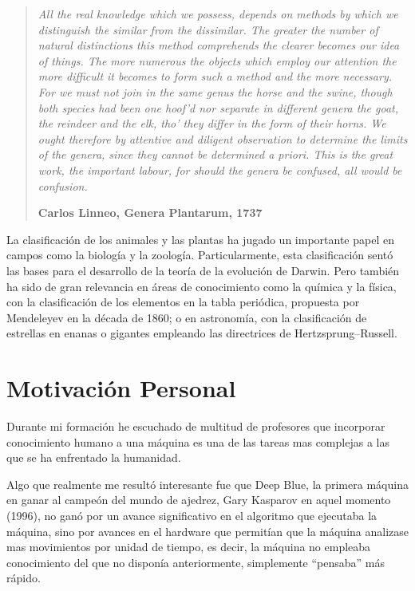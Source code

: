 \begin{quotation}{\slshape
		All the real knowledge which we possess, depends on methods by which we distinguish the similar from the dissimilar. The greater the number of natural distinctions this method comprehends the clearer becomes our idea of things. The
		more numerous the objects which employ our attention the more difficult it becomes to
		form such a method and the more necessary.
		For we must not join in the same genus the horse and the swine, though both species
		had been one hoof’d nor separate in different genera the goat, the reindeer and the elk,
		tho’ they differ in the form of their horns. We ought therefore by attentive and diligent
		observation to determine the limits of the genera, since they cannot be determined a
		priori. This is the great work, the important labour, for should the genera be confused,
		all would be confusion.} 
		\begin{flushright}
			\textbf{Carlos Linneo, Genera Plantarum, 1737}
		\end{flushright}
\end{quotation}

La clasificación de los animales y las plantas ha jugado un importante papel en campos como la biología y la zoología. Particularmente, esta clasificación sentó las bases para el desarrollo de la teoría de la evolución de Darwin. Pero también ha sido de gran relevancia en áreas de conocimiento como la química y la física, con la clasificación de los elementos en la tabla periódica, propuesta por Mendeleyev en la década de 1860; o en astronomía, con la clasificación de estrellas en enanas o gigantes empleando las directrices de Hertzsprung–Russell.

\section{Motivación Personal}

Durante mi formación he escuchado de multitud de profesores que incorporar conocimiento humano a una máquina es una de las tareas mas complejas a las que se ha enfrentado la humanidad.

Algo que realmente me resultó interesante fue que Deep Blue, la primera máquina en ganar al campeón del mundo de ajedrez, Gary Kasparov en aquel momento (1996), no ganó por un avance significativo en el algoritmo que ejecutaba la máquina, sino por avances en el hardware que permitían que la máquina analizase mas movimientos por unidad de tiempo, es decir, la máquina no empleaba conocimiento del que no disponía anteriormente, simplemente ``pensaba'' más rápido.

